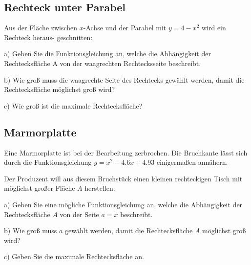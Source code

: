 \subsection{Rechteck unter Parabel}

Aus der Fläche zwischen $x$-Achse und der
Parabel mit $y=4-x^2$ wird ein Rechteck heraus-
geschnitten:

a) 
Geben Sie die Funktionsgleichung an,
welche die Abhängigkeit der Rechtecksfläche A von der waagrechten
Rechtecksseite beschreibt.

b) 
Wie groß muss die waagrechte Seite des
Rechtecks gewählt werden, damit die
Rechtecksfläche möglichst groß wird?

c)
Wie groß ist die maximale Rechtecksfläche?

\subsection{Marmorplatte}

Eine Marmorplatte ist bei der Bearbeitung zerbrochen. Die Bruchkante lässt sich durch die Funktionsgleichung $y=x^2 - 4.6x + 4.93$ einigermaßen annähern.

Der Produzent will aus diesem Bruchstück einen kleinen rechteckigen Tisch mit möglichst großer
Fläche $A$ herstellen.


a)
Geben Sie eine mögliche Funktionsgleichung an, welche die Abhängigkeit
der Rechtecksfläche $A$ von der Seite $a=x$ beschreibt.

b) Wie groß muss $a$ gewählt werden, damit die Rechtecksfläche $A$
möglichst groß wird?

c) Geben Sie die maximale Rechtecksfläche an.

